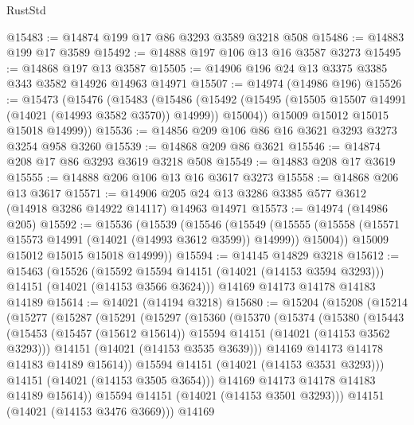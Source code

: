 \begin{lexlean}{RustStd}
\begin{coremodule}
{\begin{coremodule}
{{{{{{{{{{{{{{{{{{{{{{{{{{{{{{{{{{{{{{{@15483 := @14874 @199 @17 @86 @3293 @3589 @3218 @508
@15486 := @14883 @199 @17 @3589
@15492 := @14888 @197 @106 @13 @16 @3587 @3273
@15495 := @14868 @197 @13 @3587
@15505 := @14906 @196 @24 @13 @3375 @3385 @343 @3582 @14926 @14963 @14971
@15507 := @14974 (@14986 @196)
@15526 := @15473
    (@15476
      (@15483
        (@15486
          (@15492 (@15495 (@15505 @15507 @14991 (@14021 (@14993 @3582 @3570)) @14999)) @15004))
        @15009
        @15012
        @15015
        @15018
        @14999))
@15536 := @14856 @209 @106 @86 @16 @3621 @3293 @3273 @3254 @958 @3260
@15539 := @14868 @209 @86 @3621
@15546 := @14874 @208 @17 @86 @3293 @3619 @3218 @508
@15549 := @14883 @208 @17 @3619
@15555 := @14888 @206 @106 @13 @16 @3617 @3273
@15558 := @14868 @206 @13 @3617
@15571 := @14906 @205 @24 @13 @3286 @3385 @577 @3612 (@14918 @3286 @14922 @14117) @14963 @14971
@15573 := @14974 (@14986 @205)
@15592 := @15536
    (@15539
      (@15546
        (@15549
          (@15555 (@15558 (@15571 @15573 @14991 (@14021 (@14993 @3612 @3599)) @14999)) @15004))
        @15009
        @15012
        @15015
        @15018
        @14999))
@15594 := @14145 @14829 @3218
@15612 := @15463
    (@15526
      (@15592 @15594 @14151 (@14021 (@14153 @3594 @3293)))
      @14151
      (@14021 (@14153 @3566 @3624)))
    @14169
    @14173
    @14178
    @14183
    @14189
@15614 := @14021 (@14194 @3218)
@15680 := @15204
    (@15208
      (@15214
        (@15277
          (@15287
            (@15291
              (@15297
                (@15360
                  (@15370
                    (@15374
                      (@15380
                        (@15443
                          (@15453
                            (@15457 (@15612 @15614))
                            @15594
                            @14151
                            (@14021 (@14153 @3562 @3293)))
                          @14151
                          (@14021 (@14153 @3535 @3639)))
                        @14169
                        @14173
                        @14178
                        @14183
                        @14189
                        @15614))
                    @15594
                    @14151
                    (@14021 (@14153 @3531 @3293)))
                  @14151
                  (@14021 (@14153 @3505 @3654)))
                @14169
                @14173
                @14178
                @14183
                @14189
                @15614))
            @15594
            @14151
            (@14021 (@14153 @3501 @3293)))
          @14151
          (@14021 (@14153 @3476 @3669)))
        @14169
}}}}}}}}}}}}}}}}}}}}}}}}}}}}}}}}}}}}}}}
\end{coremodule}}
\end{coremodule}
\end{lexlean}
